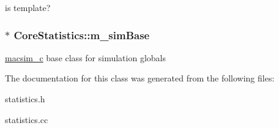 \label{classCoreStatistics_aab80ae23a0aa22e19e3f5a2b4b4710af}
is template? \hypertarget{classCoreStatistics_ab5a729b307a516a6987f52975ad7df57}{
\subsubsection[{m\_\-simBase}]{$\ast$ {\bf CoreStatistics::m\_\-simBase}}}
\label{classCoreStatistics_ab5a729b307a516a6987f52975ad7df57}
\hyperlink{classmacsim__c}{macsim\_\-c} base class for simulation globals 

The documentation for this class was generated from the following files:\begin{DoxyCompactItemize}
\item 
statistics.h\item 
statistics.cc\end{DoxyCompactItemize}

